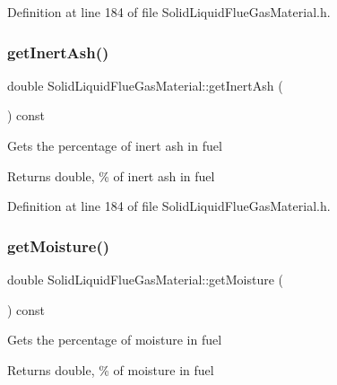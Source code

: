 Definition at line 184 of file Solid\+Liquid\+Flue\+Gas\+Material.\+h.

\mbox{\label{class_solid_liquid_flue_gas_material_a0549b32b7b5423267d5f59cc96b98127}} 
\subsubsection{\texorpdfstring{get\+Inert\+Ash()}{getInertAsh()}\hspace{0.1cm}{\footnotesize\ttfamily [3/3]}}
{\footnotesize\ttfamily double Solid\+Liquid\+Flue\+Gas\+Material\+::get\+Inert\+Ash (\begin{DoxyParamCaption}{ }\end{DoxyParamCaption}) const\hspace{0.3cm}{\ttfamily [inline]}}

Gets the percentage of inert ash in fuel \begin{DoxyReturn}{Returns}
double, \% of inert ash in fuel 
\end{DoxyReturn}


Definition at line 184 of file Solid\+Liquid\+Flue\+Gas\+Material.\+h.

\mbox{\label{class_solid_liquid_flue_gas_material_accf3c8be942d0ba244f6eabab6e7012b}} 
\subsubsection{\texorpdfstring{get\+Moisture()}{getMoisture()}\hspace{0.1cm}{\footnotesize\ttfamily [1/3]}}
{\footnotesize\ttfamily double Solid\+Liquid\+Flue\+Gas\+Material\+::get\+Moisture (\begin{DoxyParamCaption}{ }\end{DoxyParamCaption}) const\hspace{0.3cm}{\ttfamily [inline]}}

Gets the percentage of moisture in fuel \begin{DoxyReturn}{Returns}
double, \% of moisture in fuel 
\end{DoxyReturn}


